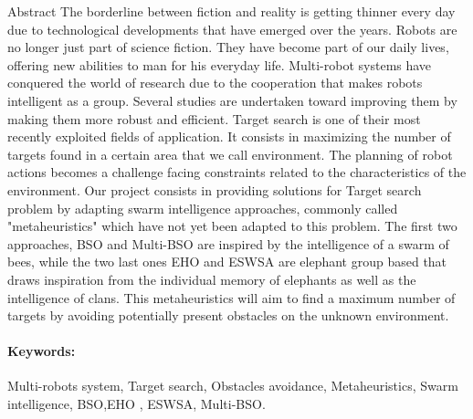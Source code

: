 \begin{poliabstract}{Abstract}
The borderline between fiction and reality is getting thinner every day due to technological developments that have emerged over the years. Robots are no longer just part of science fiction. They have become part of our daily lives, offering new abilities to man for his everyday life.
Multi-robot systems have conquered the world of research due to the cooperation that makes robots intelligent as a group. Several studies are undertaken toward improving them by making them more robust and efficient.
Target search is one of their most recently exploited fields of application. It consists in maximizing the number of targets found in a certain area that we call environment. The planning of robot actions becomes a challenge facing constraints related to the characteristics of the environment.
Our project consists in providing solutions for Target search problem by adapting swarm intelligence approaches, commonly called "metaheuristics" which have not yet been adapted to this problem. The first two approaches, BSO and Multi-BSO are inspired by the intelligence of a swarm of bees, while the two last ones EHO and ESWSA are elephant group based that draws inspiration from the individual memory of elephants as well as the intelligence of clans. This metaheuristics will aim to find a maximum number of targets by avoiding potentially present obstacles on the unknown environment.
	\paragraph{Keywords:} 	Multi-robots system, Target search, Obstacles avoidance, Metaheuristics, Swarm intelligence, BSO,EHO , ESWSA, Multi-BSO.
\end{poliabstract}

\let\cleardoublepage\clearpage

